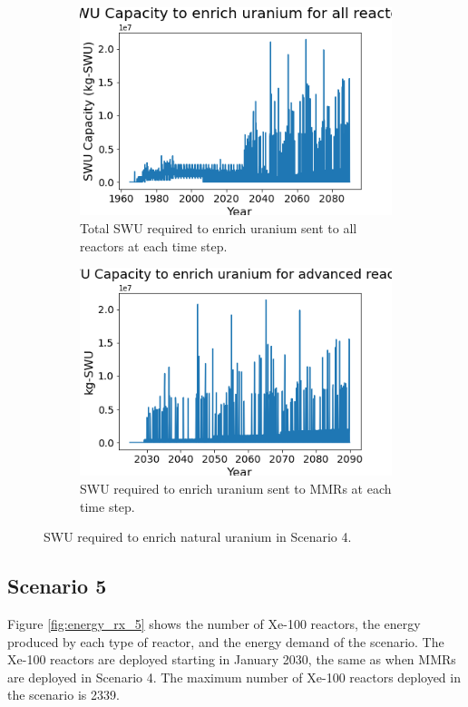 \begin{figure}
    \centering
    \begin{subfigure}{0.4\textwidth}
        \centering
        \includegraphics[scale=0.3]{figures/totalswu_scenarios_4.png}
        \caption{Total \gls{SWU} required to enrich uranium sent to all reactors at each time step.}
        \label{fig:totalswu_4}
    \end{subfigure}
    \begin{subfigure}{0.4\textwidth}
        \centering
        \includegraphics[scale=0.3]{figures/haleuSWU_scenarios_4.png}
        \caption{\gls{SWU} required to enrich uranium sent to \glspl{MMR} at each time step.}
        \label{fig:haleuswu_4}
    \end{subfigure}
    \caption{\gls{SWU} required to enrich natural uranium in Scenario 4.}
    \label{fig:swu_4}
\end{figure}


\subsection{Scenario 5}
Figure \ref{fig:energy_rx_5} shows the number of Xe-100 reactors, the 
energy produced by each type of reactor, and the energy demand of the 
scenario. The Xe-100 reactors are deployed starting in January 2030, the 
same as when 
\glspl{MMR} are deployed in Scenario 4. The maximum number of Xe-100 
reactors deployed in the scenario is 2339. 

